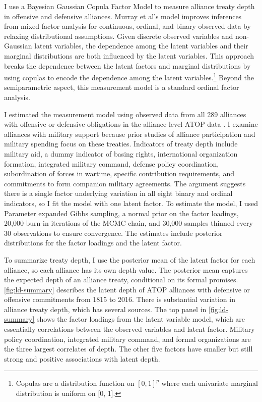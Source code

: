 \documentclass[12pt]{article}
\begin{document}
I use a Bayesian Gaussian Copula Factor Model \citep{Murrayetal2013} to measure alliance treaty depth in offensive and defensive alliances. 
Murray et al's model improves inferences from mixed factor analysis for continuous, ordinal, and binary observed data by relaxing distributional assumptions.
Given discrete observed variables and non-Gaussian latent variables, the dependence among the latent variables and their marginal distributions are both influenced by the latent variables.
This approach breaks the dependence between the latent factors and marginal distributions by using copulas to encode the dependence among the latent variables.\footnote{Copulas are a distribution function on $[0, 1]^p$ where each univariate marginal distribution is uniform on [0, 1].}
Beyond the semiparametric aspect, this measurement model is a standard ordinal factor analysis.


I estimated the measurement model using observed data from all 289 alliances with offensive or defensive obligations in the alliance-level ATOP data \citep{Leedsetal2002}. 
I examine alliances with military support because prior studies of alliance participation and military spending focus on these treaties.
Indicators of treaty depth include military aid, a dummy indicator of basing rights, international organization formation, integrated military command, defense policy coordination, subordination of forces in wartime, specific contribution requirements, and commitments to form companion military agreements.
The argument suggests there is a single factor underlying variation in all eight binary and ordinal indicators, so I fit the model with one latent factor. 
To estimate the model, I used Parameter expanded Gibbs sampling, a normal prior on the factor loadings, 20,000 burn-in iterations of the MCMC chain, and 30,000 samples thinned every 30 observations to ensure convergence. 
The estimates include posterior distributions for the factor loadings and the latent factor. 


To summarize treaty depth, I use the posterior mean of the latent factor for each alliance, so each alliance has its own depth value.
The posterior mean captures the expected depth of an alliance treaty, conditional on its formal promises. 
\autoref{fig:ld-summary} describes the latent depth of ATOP alliances with defensive or offensive commitments from 1815 to 2016.
There is substantial variation in alliance treaty depth, which has several sources. 
The top panel in \autoref{fig:ld-summary} shows the factor loadings from the latent variable model, which are essentially correlations between the observed variables and latent factor. 
Military policy coordination, integrated military command, and formal organizations are the three largest correlates of depth. 
The other five factors have smaller but still strong and positive associations with latent depth. 
\end{document}
